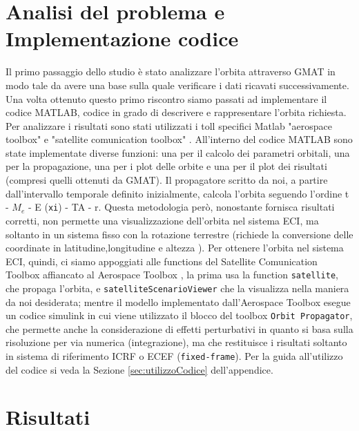 \documentclass[12pt, a4paper]{article}
\begin{document}
\section{Analisi del problema e Implementazione codice}
\label{sec:codice}
Il primo passaggio dello studio è stato analizzare l'orbita attraverso GMAT \parencite{DocumentazioneGMAT} in modo tale da avere una base sulla quale verificare i dati ricavati successivamente. Una volta ottenuto questo primo riscontro siamo passati ad implementare il codice MATLAB, codice in grado di descrivere e rappresentare l'orbita richiesta. Per analizzare i risultati sono stati utilizzati i toll specifici Matlab "aerospace toolbox" \cite{AerospaceBlockset,AerospaceToolbox} e "satellite comunication toolbox" \cite{SatelliteCommunication,CommunicationToolbox}.
All'interno del codice MATLAB sono state implementate diverse funzioni: una per il calcolo dei parametri orbitali, una per la propagazione, una per i plot delle orbite e una per il plot dei risultati (compresi quelli ottenuti da GMAT). Il propagatore scritto da noi, a partire dall'intervallo temporale definito inizialmente, calcola l'orbita seguendo l'ordine t - $M_e$ - E (\texttt{xi}) - TA - r. Questa metodologia però, nonostante fornisca risultati corretti, non permette una visualizzazione dell'orbita nel sistema ECI, ma soltanto in un sistema fisso con la rotazione terrestre (richiede la conversione delle coordinate in latitudine,longitudine e altezza \cite{MappingToolbox}). Per ottenere l'orbita nel sistema ECI, quindi, ci siamo appoggiati alle functions del Satellite Comunication Toolbox \cite{SatelliteCommunication} affiancato al Aerospace Toolbox \cite{AerospaceToolbox}, la prima usa la function \texttt{satellite}, che propaga l'orbita, e \texttt{satelliteScenarioViewer} che la visualizza nella maniera da noi desiderata; mentre il modello implementato dall'Aerospace Toolbox esegue un codice simulink \cite{Simulink,DSPSystemToolbox} in cui viene utilizzato il blocco del toolbox \texttt{Orbit Propagator}\cite{AerospaceBlockset}, che permette anche la considerazione di effetti perturbativi in quanto si basa sulla risoluzione per via numerica (integrazione), ma che restituisce i risultati soltanto in sistema di riferimento ICRF o ECEF (\texttt{fixed-frame}).
Per la guida all'utilizzo del codice si veda la Sezione \ref{sec:utilizzoCodice} dell'appendice.

\section{Risultati}
\end{document}
